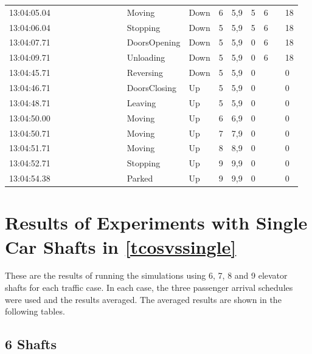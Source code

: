 \documentclass{UoYCSproject}
\begin{document}
\begin{appendices}
\begin{landscape}
\begin{longtable}{l || l | l | l | l | l | l | l | l || l | l | l | l | l | l | l | l}
	13:04:05.04 &  &  &  &  &  &  &  &  & Moving & Down & 6 & 5,9 & 5 & 6 &  & 18 \\
	13:04:06.04 &  &  &  &  &  &  &  &  & Stopping & Down & 5 & 5,9 & 5 & 6 &  & 18 \\
	13:04:07.71 &  &  &  &  &  &  &  &  & DoorsOpening & Down & 5 & 5,9 & 0 & 6 &  & 18 \\
	13:04:09.71 &  &  &  &  &  &  &  &  & Unloading & Down & 5 & 5,9 & 0 & 6 &  & 18 \\
	13:04:45.71 &  &  &  &  &  &  &  &  & Reversing & Down & 5 & 5,9 & 0 &  &  & 0 \\
	13:04:46.71 &  &  &  &  &  &  &  &  & DoorsClosing & Up & 5 & 5,9 & 0 &  &  & 0 \\
	13:04:48.71 &  &  &  &  &  &  &  &  & Leaving & Up & 5 & 5,9 & 0 &  &  & 0 \\
	13:04:50.00 &  &  &  &  &  &  &  &  & Moving & Up & 6 & 6,9 & 0 &  &  & 0 \\
	13:04:50.71 &  &  &  &  &  &  &  &  & Moving & Up & 7 & 7,9 & 0 &  &  & 0 \\
	13:04:51.71 &  &  &  &  &  &  &  &  & Moving & Up & 8 & 8,9 & 0 &  &  & 0 \\
	13:04:52.71 &  &  &  &  &  &  &  &  & Stopping & Up & 9 & 9,9 & 0 &  &  & 0 \\
	13:04:54.38 &  &  &  &  &  &  &  &  & Parked & Up & 9 & 9,9 & 0 &  &  & 0
\end{longtable}
\end{landscape}

\chapter{Results of Experiments with Single Car Shafts in \autoref{tcosvssingle}}
\label{tradresults}

These are the results of running the simulations using 6, 7, 8 and 9 elevator shafts for each traffic case.  In each case, the three passenger arrival schedules were used and the results averaged.  The averaged results are shown in the following tables.

\section{6 Shafts}


\end{appendices}
\end{document}
